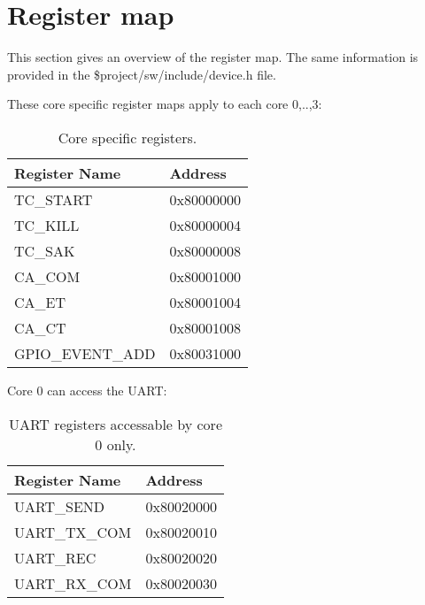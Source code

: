 \chapter{Register map}
\label{atomics}

This section gives an overview of the register map. The same information is provided in the \$project/sw/include/device.h file.

These core specific register maps apply to each core 0,..,3:

\vspace{-0.6in}
\begin{table}[h]
	{
		\begin{small}
			\begin{center}
	\begin{tabular}{l | l}
		Register Name & Address\\ \hline \hline
		TC\_START          & 0x80000000\\
TC\_KILL           & 0x80000004\\
TC\_SAK            & 0x80000008\\
CA\_COM            & 0x80001000\\
CA\_ET             & 0x80001004\\
CA\_CT             & 0x80001008\\
GPIO\_EVENT\_ADD    & 0x80031000\\
	\end{tabular}
\end{center}
\end{small}
	}
	\caption{Core specific registers.}
	\label{register_map_0}
\end{table}

Core 0 can access the UART:

\begin{table}[h]
	{
		\begin{small}
			\begin{center}
	\begin{tabular}{l | l}
		Register Name & Address\\ \hline \hline
UART\_SEND         & 0x80020000\\
UART\_TX\_COM       & 0x80020010\\
UART\_REC          & 0x80020020\\
UART\_RX\_COM       & 0x80020030\\
	\end{tabular}
\end{center}
\end{small}
	}
	\caption{UART registers accessable by core 0 only.}
	\label{register_map_1}
\end{table}

